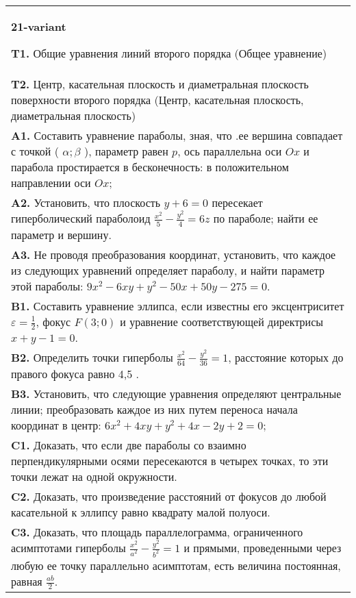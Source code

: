\documentclass{article}
\begin{document}
\begin{tabular}{m{17cm}}
\textbf{21-variant}
\newline

\textbf{T1.} Общие уравнения линий второго порядка (Общее уравнение) \\
\textbf{T2.} Центр, касательная плоскость и диаметральная плоскость поверхности второго порядка (Центр, касательная плоскость, диаметральная плоскость) \\
\textbf{A1.} Составить уравнение параболы, зная, что .ее вершина совпадает с точкой ( $\alpha ; \beta$ ), параметр равен $p$, ось параллельна оси $O x$ и парабола простирается в бесконечность: в положительном направлении оси $O x$; \\
\textbf{A2.} Установить, что плоскость $y+6=0$ пересекает гиперболический параболоид $\frac{x^2}{5}-\frac{y^2}{4}=6 z$ по параболе; найти ее параметр и вершину. \\
\textbf{A3.} Не проводя преобразования координат, установить, что каждое из следующих уравнений определяет параболу, и найти параметр этой параболы: $9 x^2-6 x y+y^2-50 x+50 y-275=0$. \\
\textbf{B1.} Составить уравнение эллипса, если известны его эксцентриситет $\varepsilon=\frac{1}{2}$, фокус $F(3 ; 0)$ и уравнение соответствующей директрисы $x+y-1=0$. \\
\textbf{B2.} Определить точки гиперболы $\frac{x^2}{64}-\frac{y^2}{36}=1$, расстояние которых до правого фокуса равно 4,5 . \\
\textbf{B3.} Установить, что следующие уравнения определяют центральные линии; преобразовать каждое из них путем переноса начала координат в центр: $6 x^2+4 x y+y^2+4 x-2 y+2=0$; \\
\textbf{C1.} Доказать, что если две параболы со взаимно перпендикулярными осями пересекаются в четырех точках, то эти точки лежат на одной окружности. \\
\textbf{C2.} Доказать, что произведение расстояний от фокусов до любой касательной к эллипсу равно квадрату малой полуоси. \\
\textbf{C3.} Доказать, что площадь параллелограмма, ограниченного асимптотами гиперболы $\frac{x^2}{a^2}-\frac{y^2}{b^2}=1$ и прямыми, проведенными через любую ее точку параллельно асимптотам, есть величина постоянная, равная $\frac{a b}{2}$. \\

\end{tabular}
\vspace{1cm}
\end{document}
